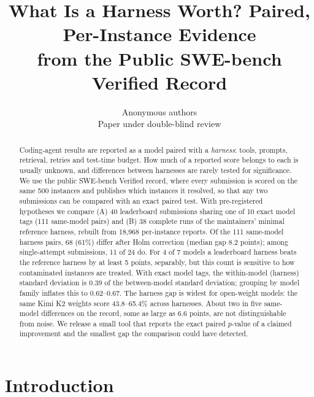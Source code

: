 \documentclass[10pt]{article}
\title{What Is a Harness Worth? Paired, Per-Instance Evidence\\from the Public SWE-bench Verified Record}
\author{\name Anonymous authors \\ \addr Paper under double-blind review}
\begin{document}
\maketitle

\begin{abstract}
Coding-agent results are reported as a model paired with a \emph{harness}: tools, prompts, retrieval, retries and test-time budget. How much of a reported score belongs to each is usually unknown, and differences between harnesses are rarely tested for significance. We use the public SWE-bench Verified record, where every submission is scored on the same 500 instances and publishes which instances it resolved, so that any two submissions can be compared with an exact paired test. With pre-registered hypotheses we compare (A) 40 leaderboard submissions sharing one of 10 exact model tags (111 same-model pairs) and (B) 38 complete runs of the maintainers' minimal reference harness, rebuilt from 18,968 per-instance reports. Of the 111 same-model harness pairs, 68 (61\%) differ after Holm correction (median gap 8.2 points); among single-attempt submissions, 11 of 24 do. For 4 of 7 models a leaderboard harness beats the reference harness by at least 5 points, separably, but this count is sensitive to how contaminated instances are treated. With exact model tags, the within-model (harness) standard deviation is 0.39 of the between-model standard deviation; grouping by model family inflates this to 0.62--0.67. The harness gap is widest for open-weight models: the same Kimi K2 weights score 43.8--65.4\% across harnesses. About two in five same-model differences on the record, some as large as 6.6 points, are not distinguishable from noise. We release a small tool that reports the exact paired $p$-value of a claimed improvement and the smallest gap the comparison could have detected.
\end{abstract}

{\renewcommand{\thefootnote}{}}

\section{Introduction}
\end{document}
